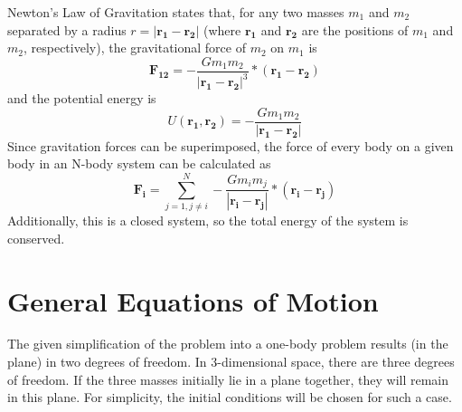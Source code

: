 \documentclass[preprint,titlepage,preprintnumbers,amsmath,amssymb,aps,11pt]{revtex4-2}
\begin{document}
Newton's Law of Gravitation states that, for any two masses $m_1$ and $m_2$ separated by a radius $r=|\bm{r_1}-\bm{r_2}|$ (where $\bm{r_1}$ and $\bm{r_2}$ are the positions of $m_1$ and $m_2$, respectively), the gravitational force of $m_2$ on $m_1$ is
\begin{equation}
    \bm{F_{12}}=-\frac{Gm_1 m_2}{|\bm{r_1}-\bm{r_2}|^3}*(\bm{r_1}-\bm{r_2})
\end{equation}
and the potential energy is
\begin{equation}
    U(\bm{r_1},\bm{r_2})=-\frac{Gm_1 m_2}{|\bm{r_1}-\bm{r_2}|}
\end{equation}
Since gravitation forces can be superimposed, the force of every body on a given body in an N-body system can be calculated as
\begin{equation}
    \bm{F_i}=\sum_{j=1, j \neq i}^N -\frac{Gm_im_j}{|\bm{r_i}-\bm{r_j}|}*(\bm{r_i}-\bm{r_j})
\end{equation}
Additionally, this is a closed system, so the total energy of the system is conserved.

\section{General Equations of Motion}
The given simplification of the problem into a one-body problem results (in the plane) in two degrees of freedom. In 3-dimensional space, there are three degrees of freedom. If the three masses initially lie in a plane together, they will remain in this plane. For simplicity, the initial conditions will be chosen for such a case.
\end{document}
